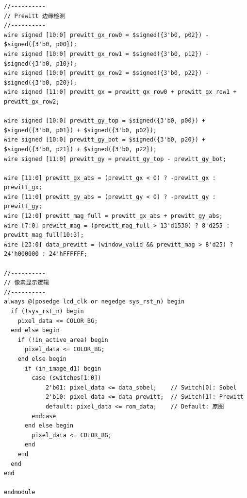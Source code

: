 \documentclass[12pt,hyperref,a4paper,UTF8]{ctexart}
\begin{document}
\begin{lstlisting}[caption={lcd\_display.v完整代码}]
//----------
// Prewitt 边缘检测
//----------
wire signed [10:0] prewitt_gx_row0 = $signed({3'b0, p02}) - $signed({3'b0, p00});
wire signed [10:0] prewitt_gx_row1 = $signed({3'b0, p12}) - $signed({3'b0, p10});
wire signed [10:0] prewitt_gx_row2 = $signed({3'b0, p22}) - $signed({3'b0, p20});
wire signed [11:0] prewitt_gx = prewitt_gx_row0 + prewitt_gx_row1 + prewitt_gx_row2;

wire signed [10:0] prewitt_gy_top = $signed({3'b0, p00}) + $signed({3'b0, p01}) + $signed({3'b0, p02});
wire signed [10:0] prewitt_gy_bot = $signed({3'b0, p20}) + $signed({3'b0, p21}) + $signed({3'b0, p22});
wire signed [11:0] prewitt_gy = prewitt_gy_top - prewitt_gy_bot;

wire [11:0] prewitt_gx_abs = (prewitt_gx < 0) ? -prewitt_gx : prewitt_gx;
wire [11:0] prewitt_gy_abs = (prewitt_gy < 0) ? -prewitt_gy : prewitt_gy;
wire [12:0] prewitt_mag_full = prewitt_gx_abs + prewitt_gy_abs;
wire [7:0] prewitt_mag = (prewitt_mag_full > 13'd1530) ? 8'd255 : prewitt_mag_full[10:3];
wire [23:0] data_prewitt = (window_valid && prewitt_mag > 8'd25) ? 24'h000000 : 24'hFFFFFF;

//----------
// 像素显示逻辑
//----------
always @(posedge lcd_clk or negedge sys_rst_n) begin
  if (!sys_rst_n) begin
    pixel_data <= COLOR_BG;
  end else begin
    if (!in_active_area) begin
      pixel_data <= COLOR_BG;
    end else begin
      if (in_image_d1) begin
        case (switches[1:0])
            2'b01: pixel_data <= data_sobel;    // Switch[0]: Sobel
            2'b10: pixel_data <= data_prewitt;  // Switch[1]: Prewitt
            default: pixel_data <= rom_data;    // Default: 原图
        endcase
      end else begin
        pixel_data <= COLOR_BG;
      end
    end
  end
end

endmodule
\end{lstlisting}
\end{document}
